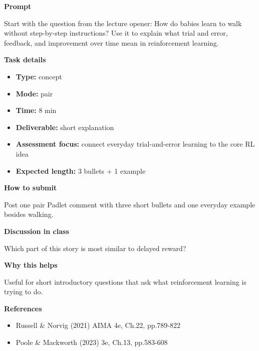\documentclass[11pt]{article}
\begin{document}
\begin{tcolorbox}[colback=white,colframe=MidnightBlue,title={Q1 Starter Intuition},fonttitle=\bfseries,breakable]
\begin{center}
\end{center}

{\large\bfseries\color{MidnightBlue} Prompt}\par\medskip
Start with the question from the lecture opener: How do babies learn to walk without step-by-step instructions? Use it to explain what trial and error, feedback, and improvement over time mean in reinforcement learning.

{\large\bfseries\color{MidnightBlue} Task details}\par\medskip
\begin{itemize}\item \textbf{Type:} concept
\item \textbf{Mode:} pair
\item \textbf{Time:} 8 min
\item \textbf{Deliverable:} short explanation
\item \textbf{Assessment focus:} connect everyday trial-and-error learning to the core RL idea
\item \textbf{Expected length:} 3 bullets + 1 example\end{itemize}

{\large\bfseries\color{MidnightBlue} How to submit}\par\medskip
Post one pair Padlet comment with three short bullets and one everyday example besides walking.

{\large\bfseries\color{MidnightBlue} Discussion in class}\par\medskip
Which part of this story is most similar to delayed reward?

{\large\bfseries\color{MidnightBlue} Why this helps}\par\medskip
Useful for short introductory questions that ask what reinforcement learning is trying to do.

{\large\bfseries\color{MidnightBlue} References}\par\medskip
\begin{itemize}\item Russell \& Norvig (2021) AIMA 4e, Ch.22, pp.789-822
\item Poole \& Mackworth (2023) 3e, Ch.13, pp.583-608\end{itemize}
\end{tcolorbox}
\end{document}

